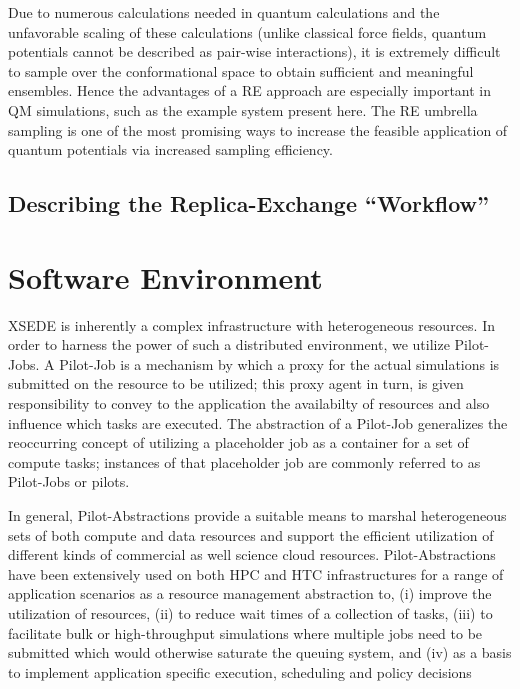 \documentclass{sig-alternate}
\begin{document}
Due to numerous calculations needed in quantum calculations and the unfavorable scaling
of these calculations (unlike classical force fields, quantum potentials cannot be
described as pair-wise interactions), it is extremely difficult to sample over the
conformational space to obtain sufficient and meaningful ensembles.  Hence the
advantages of a RE approach are especially important in QM simulations, such as the
example system present here.  The RE umbrella sampling is one of the most promising ways
to increase the feasible application of quantum potentials via increased sampling
efficiency.

\subsection{Describing the Replica-Exchange ``Workflow'' } \label{}


\section{Software Environment}

XSEDE is inherently a complex infrastructure with heterogeneous
resources. In order to harness the power of such a distributed
environment, we utilize Pilot-Jobs. A Pilot-Job is a mechanism by 
which a proxy for the actual simulations
is submitted on the resource to be utilized; this proxy agent in turn,
is given responsibility to convey to the application the availabilty
of resources and also influence which tasks are executed. The
abstraction of a Pilot-Job generalizes the reoccurring concept of
utilizing a placeholder job as a container for a set of compute tasks;
instances of that placeholder job are commonly referred to as
Pilot-Jobs or pilots. 

In general, Pilot-Abstractions provide a suitable means to marshal
heterogeneous sets of both compute and data resources and support the
efficient utilization of different kinds of commercial as well science
cloud resources. Pilot-Abstractions have been extensively used on both
HPC and HTC infrastructures for a range of application scenarios as a
resource management abstraction to, (i) improve the utilization of
resources, (ii) to reduce wait times of a collection of tasks, (iii)
to facilitate bulk or high-throughput simulations where multiple jobs
need to be submitted which would otherwise saturate the queuing
system, and (iv) as a basis to implement application specific
execution, scheduling and policy decisions
\end{document}
